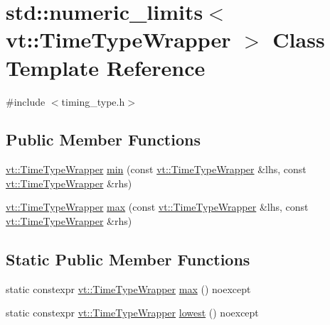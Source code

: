 \hypertarget{classstd_1_1numeric__limits_3_01vt_1_1_time_type_wrapper_01_4}{}\section{std\+:\+:numeric\+\_\+limits$<$ vt\+:\+:Time\+Type\+Wrapper $>$ Class Template Reference}
\label{classstd_1_1numeric__limits_3_01vt_1_1_time_type_wrapper_01_4}


{\ttfamily \#include $<$timing\+\_\+type.\+h$>$}

\subsection*{Public Member Functions}
\begin{DoxyCompactItemize}
\item 
\hyperlink{structvt_1_1_time_type_wrapper}{vt\+::\+Time\+Type\+Wrapper} \hyperlink{classstd_1_1numeric__limits_3_01vt_1_1_time_type_wrapper_01_4_abb4cb38645a9cacc842f030a8f0c9f73}{min} (const \hyperlink{structvt_1_1_time_type_wrapper}{vt\+::\+Time\+Type\+Wrapper} \&lhs, const \hyperlink{structvt_1_1_time_type_wrapper}{vt\+::\+Time\+Type\+Wrapper} \&rhs)
\item 
\hyperlink{structvt_1_1_time_type_wrapper}{vt\+::\+Time\+Type\+Wrapper} \hyperlink{classstd_1_1numeric__limits_3_01vt_1_1_time_type_wrapper_01_4_a47beb71d1c1bef56c1158486f2e82c74}{max} (const \hyperlink{structvt_1_1_time_type_wrapper}{vt\+::\+Time\+Type\+Wrapper} \&lhs, const \hyperlink{structvt_1_1_time_type_wrapper}{vt\+::\+Time\+Type\+Wrapper} \&rhs)
\end{DoxyCompactItemize}
\subsection*{Static Public Member Functions}
\begin{DoxyCompactItemize}
\item 
static constexpr \hyperlink{structvt_1_1_time_type_wrapper}{vt\+::\+Time\+Type\+Wrapper} \hyperlink{classstd_1_1numeric__limits_3_01vt_1_1_time_type_wrapper_01_4_acf5aa2aebcce3c80ebb531896b08041a}{max} () noexcept
\item 
static constexpr \hyperlink{structvt_1_1_time_type_wrapper}{vt\+::\+Time\+Type\+Wrapper} \hyperlink{classstd_1_1numeric__limits_3_01vt_1_1_time_type_wrapper_01_4_a4cd83330ab57b16a325f7615c297cde7}{lowest} () noexcept
\end{DoxyCompactItemize}
